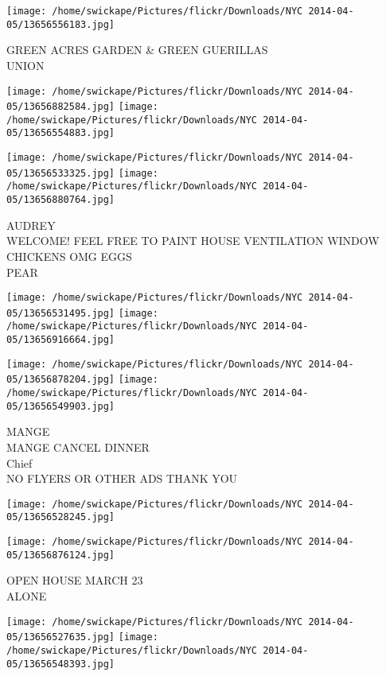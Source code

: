 \documentclass[10pt,letterpaper]{article}
\begin{document}
\vspace{0.25in}
\texttt{[image: /home/swickape/Pictures/flickr/Downloads/NYC 2014-04-05/13656556183.jpg]}

GREEN ACRES GARDEN \& GREEN GUERILLAS\\
UNION\\
\pagebreak

\texttt{[image: /home/swickape/Pictures/flickr/Downloads/NYC 2014-04-05/13656882584.jpg]}
\texttt{[image: /home/swickape/Pictures/flickr/Downloads/NYC 2014-04-05/13656554883.jpg]}

\texttt{[image: /home/swickape/Pictures/flickr/Downloads/NYC 2014-04-05/13656533325.jpg]}
\texttt{[image: /home/swickape/Pictures/flickr/Downloads/NYC 2014-04-05/13656880764.jpg]}

AUDREY\\
WELCOME!  FEEL FREE TO PAINT HOUSE  VENTILATION WINDOW\\
CHICKENS OMG EGGS\\
PEAR\\
\pagebreak

\texttt{[image: /home/swickape/Pictures/flickr/Downloads/NYC 2014-04-05/13656531495.jpg]}
\texttt{[image: /home/swickape/Pictures/flickr/Downloads/NYC 2014-04-05/13656916664.jpg]}

\texttt{[image: /home/swickape/Pictures/flickr/Downloads/NYC 2014-04-05/13656878204.jpg]}
\texttt{[image: /home/swickape/Pictures/flickr/Downloads/NYC 2014-04-05/13656549903.jpg]}

MANGE\\
MANGE CANCEL DINNER\\
Chief\\
NO FLYERS OR OTHER ADS THANK YOU\\
\pagebreak

\texttt{[image: /home/swickape/Pictures/flickr/Downloads/NYC 2014-04-05/13656528245.jpg]}

\vspace{0.25in}
\texttt{[image: /home/swickape/Pictures/flickr/Downloads/NYC 2014-04-05/13656876124.jpg]}

OPEN HOUSE MARCH 23\\
ALONE\\
\pagebreak

\texttt{[image: /home/swickape/Pictures/flickr/Downloads/NYC 2014-04-05/13656527635.jpg]}
\texttt{[image: /home/swickape/Pictures/flickr/Downloads/NYC 2014-04-05/13656548393.jpg]}
\end{document}
